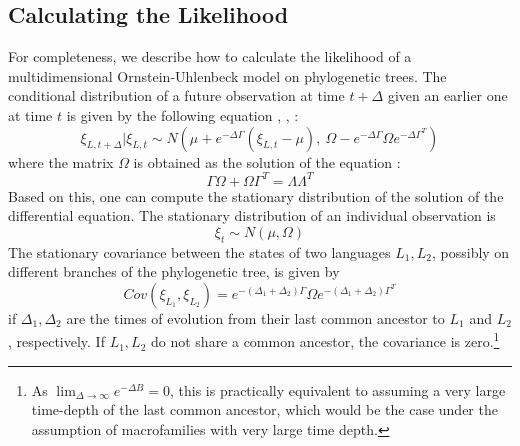 \documentclass[11pt,a4paper]{article}
\begin{document}

\subsection{Calculating the Likelihood}
For completeness, we describe how to calculate the likelihood of a multidimensional Ornstein-Uhlenbeck model on phylogenetic trees.
The conditional distribution of a future observation at time $t+\Delta$ given an earlier one at time $t$ is given by the following equation \citep[Theorem 3.3]{schach1971weak}, \citep{gardiner1983handbook}, \citep[p. 156, eq. 6.124]{risken1989fokker}:
\begin{equation}
\xi_{L,t+\Delta} | \xi_{L,t} \sim N\left(\mu + e^{-\Delta \Gamma} (\xi_{L,t}-\mu),\ \Omega - e^{-\Delta \Gamma} \Omega e^{-\Delta \Gamma^T}\right)
\end{equation}
where the matrix $\Omega$ is obtained as the solution of the equation \citep[p. 110, eq. 4.4.51]{gardiner1983handbook} \citep[p. 156, eq. 6.126]{risken1989fokker}:
\begin{equation}
    \Gamma\Omega+\Omega\Gamma^T = \Lambda \Lambda^T
\end{equation}
Based on this, one can compute the stationary distribution of the solution of the differential equation.
The stationary distribution of an individual observation is
\begin{equation}\label{eq:ornuhl-var}
\xi_{t} \sim N\left(\mu, \Omega \right)
\end{equation}
The stationary covariance between the states of two languages $L_1, L_2$, possibly on different branches of the phylogenetic tree, is given by
\begin{equation}\label{eq:ornuhl-covar}
Cov(\xi_{L_1}, \xi_{L_2}) = e^{-(\Delta_1 + \Delta_2) \Gamma} \Omega e^{-(\Delta_1 + \Delta_2) \Gamma^T}
\end{equation}
if $\Delta_1, \Delta_2$ are the times of evolution from their last common ancestor to $L_1$ and $L_2$, respectively.
If $L_1, L_2$ do not share a common ancestor, the covariance is zero.\footnote{As $\lim_{\Delta \rightarrow \infty} e^{-\Delta B} = 0$, this is practically equivalent to assuming a very large time-depth of the last common ancestor, which would be the case under the assumption of macrofamilies with very large time depth.}
\end{document}
